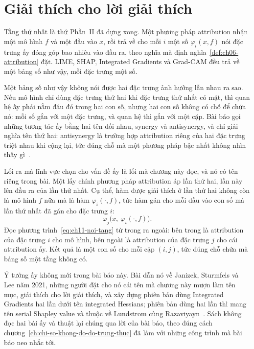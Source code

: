 \section{Giải thích cho lời giải thích}
\label{sec:ch11-giai-thich-cho-loi-giai-thich}

%
Tầng thứ nhất là thứ Phần~II đã dựng xong. Một phương pháp attribution nhận một
mô hình $f$ và một đầu vào $x$, rồi trả về cho mỗi  $i$ một số
$\varphi_i(x,f)$ nói đặc trưng ấy đóng góp bao nhiêu vào đầu ra, theo nghĩa mà
định nghĩa~\ref{def:ch06-attribution} đặt. LIME, SHAP, Integrated Gradients và
Grad-CAM đều trả về một bảng số như vậy, mỗi đặc trưng một số.

Một bảng số như vậy không nói được hai đặc trưng ảnh hưởng lẫn nhau ra sao. Nếu
mô hình chỉ dùng đặc trưng thứ hai khi đặc trưng thứ nhất có mặt, thì quan hệ ấy
phải nằm đâu đó trong hai con số, nhưng hai con số không có chỗ để chứa nó: mỗi
số gắn với một đặc trưng, và quan hệ thì gắn với một cặp. Bài báo gọi những
tương tác ấy bằng hai tên đối nhau, synergy và antisynergy, và chỉ giải nghĩa
tên thứ hai: antisynergy là trường hợp attribution riêng của hai đặc trưng
triệt nhau khi cộng lại, tức đúng chỗ mà một phương pháp bậc nhất không nhìn
thấy gì~\autocite{p23metagame}.

Lối ra mà lĩnh vực chọn cho vấn đề ấy là lối mà chương này đọc, và nó có tên
riêng trong bài. Một  lấy chính
phương pháp attribution áp lần thứ hai, lần này lên đầu ra của lần thứ nhất.
Cụ thể, hàm được giải thích ở lần thứ hai không còn là mô hình $f$ nữa mà là
hàm $\varphi_i(\cdot,f)$, tức hàm gán cho mỗi đầu vào con số mà lần thứ nhất đã
gán cho đặc trưng $i$:
%
\begin{equation}
  \label{eq:ch11-noi-tang}
  \varphi_j\bigl(x,\ \varphi_i(\cdot,f)\bigr).
\end{equation}
%
Đọc phương trình~\ref{eq:ch11-noi-tang} từ trong ra ngoài: bên trong là
attribution của đặc trưng $i$ cho mô hình, bên ngoài là attribution của đặc
trưng $j$ cho cái attribution ấy. Kết quả là một con số cho mỗi cặp $(i,j)$,
tức đúng chỗ chứa mà bảng số một tầng không có.

Ý tưởng ấy không mới trong bài báo này. Bài dẫn nó về Janizek, Sturmfels và Lee
năm 2021, những người đặt cho nó cái tên mà chương này mượn làm tên mục, giải
thích cho lời giải thích, và xây dựng phiên bản dùng Integrated Gradients hai
lần dưới tên integrated Hessians; phiên bản dùng  hai lần thì
mang tên serial Shapley value và thuộc về Lundstrom cùng
Razaviyayn~\autocite{p23metagame}. Sách không đọc hai bài ấy và thuật lại chúng
qua lời của bài báo, theo đúng cách chương~\ref{ch:chi-so-khong-do-do-trung-thuc}
đã làm với những công trình mà bài báo neo nhắc tới.

